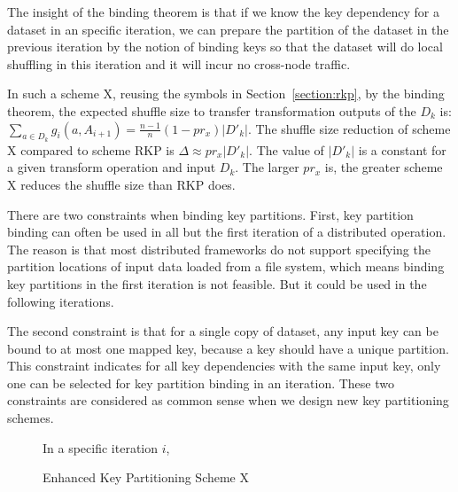 \documentclass[10pt,journal,compsoc]{IEEEtran}
\makeatletter
\newcommand{\removelatexerror}{\let\@latex@error\@gobble}
\makeatother
\begin{document}
The insight of the binding theorem is that if we know the key dependency 
for a dataset in an specific iteration,  we can prepare the partition
of the dataset in the previous iteration by the notion of binding keys so that the dataset
will do local shuffling in this iteration and it will incur no cross-node traffic. 

In such a scheme X, reusing the symbols in Section~\ref{section:rkp}, 
by the binding theorem, the expected shuffle size to transfer 
transformation outputs of the $D_k$ is: $\sum_{a \in D_k} g_i(a, A_{i+1}) = \frac{n-1}{n} (1 - pr_x) |D'_{k}|$.
The shuffle size reduction of scheme X compared to scheme RKP is 
$ \Delta \approx pr_x |D'_{k}|$. 
The value of $|D'_{k}|$ is a constant for a given transform operation and input $D_k$. 
The larger $pr_x$ is, the greater scheme X reduces the shuffle size than RKP does. 

There are two constraints when binding key partitions. 
First, key partition binding can often be used in all but the first iteration of a distributed operation.
The reason is that most distributed frameworks do not support specifying the partition locations of input data loaded from a file system, which means 
binding key partitions in the first iteration is not feasible. 
But it could be used in the following iterations.

The second constraint is that for a single copy of dataset, any input key can be bound to at most one mapped 
key, because a key should have a unique partition. 
This constraint indicates for all key dependencies with the same input key, only one can be selected for key partition binding in an iteration. 
These two constraints are considered as common sense when we design new key partitioning schemes.

\begin{figure}[!t]
\removelatexerror

\begin{algorithm}[H]
  In a specific iteration $i$,

\caption{Enhanced Key Partitioning Scheme X}
\label{algo:x}
\end{algorithm}
\end{figure}
\end{document}

